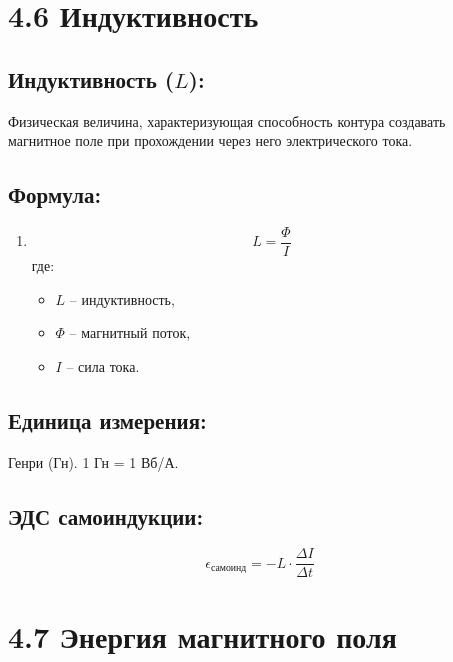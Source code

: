 \documentclass[a4paper,12pt]{article}
\begin{document}
\newpage

\section*{4.6 Индуктивность}
\vspace{-9pt}
\subsection*{Индуктивность ($L$):}
\vspace{-3pt}
Физическая величина, характеризующая способность контура создавать магнитное поле при прохождении через него электрического тока.

\vspace{-9pt}
\subsection*{Формула:}
\vspace{-3pt}
\begin{enumerate}[itemsep=0pt, topsep=0pt, parsep=3pt]
  \item 
  \vspace{-0.05em}
  $$ L = \frac{\Phi}{I} $$
  где:
  \begin{itemize}
    \item $L$ – индуктивность,
    \item $\Phi$ – магнитный поток,
    \item $I$ – сила тока.
  \end{itemize}
\end{enumerate}

\vspace{-9pt}
\subsection*{Единица измерения:}
\vspace{-3pt}
Генри (Гн). 1 Гн = 1 Вб/А.

\vspace{-9pt}
\subsection*{ЭДС самоиндукции:}
\vspace{-3pt}
\vspace{-0.05em}
$$ \epsilon_{самоинд} = -L \cdot \frac{\Delta I}{\Delta t} $$

\section*{4.7 Энергия магнитного поля}
\vspace{-9pt}
\end{document}
